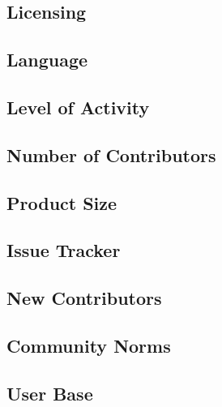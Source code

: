 \documentclass[11pt]{article}
\begin{document}
\subsection{Licensing}
\label{subsec:kernel_license}

\subsection{Language}
\label{subsec:kernel_language}

\subsection{Level of Activity}
\label{subsec:kernel_activity}

\subsection{Number of Contributors}
\label{subsec:kernel_contributors}

\subsection{Product Size}
\label{subsec:kernel_codebase}

\subsection{Issue Tracker}
\label{subsec:kernel_issue_tracker}

\subsection{New Contributors}
\label{subsec:kernel_newbies}

\subsection{Community Norms}
\label{subsec:kernel_community}

\subsection{User Base}
\label{subsec:kernel_users}
\end{document}
